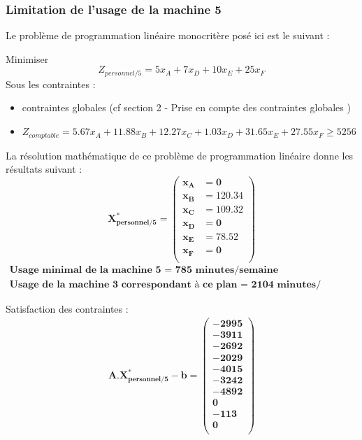 \documentclass[12pt]{article}
\begin{document}
\subsubsection{Limitation de l'usage de la machine 5}
Le problème de programmation linéaire monocritère posé ici est le suivant :
\begin{tcolorbox}
Minimiser
\begin{equation*}
 Z_{personnel/5}= 5x_{A} + 7x_{D} + 10x_{E} + 25x_{F}
\end{equation*}
Sous les contraintes :
\begin{itemize}
\item contraintes globales (cf section 2 - Prise en compte des contraintes globales )
\item $ Z_{comptable}= 5.67x_{A} +11.88x_{B} +12.27x_{C} +1.03x_{D} +31.65x_{E} +27.55x_{F} \geq 5256$
\end{itemize}
\end{tcolorbox}
La résolution mathématique de ce problème de programmation linéaire donne les résultats suivant :\\
\begin{equation*}
\boldsymbol{X^{*}_{personnel/5} = 
   \left (
   \begin{aligned}
      x_{A} &= 0 \\
      x_{B} &= 120.34 \\
      x_{C} &= 109.32 \\
      x_{D} &= 0 \\
      x_{E} &= 78.52 \\ 
      x_{F} &= 0 \\
   \end{aligned}
   \right )
 } 
\end{equation*}
\begin{align*}
\textbf{Usage minimal de la machine 5 = 785 minutes/semaine} \\
\textbf{Usage de la machine 3 correspondant à ce plan = 2104 minutes/semaine}
\end{align*}


Satisfaction des contraintes : 
\begin{align*}
\boldsymbol{A.X^{*}_{personnel/5} - b = 
   \left (
   \begin{aligned}
      -2995 \\
      -3911 \\
      -2692 \\
      -2029 \\
      -4015 \\
      -3242 \\
      -4892 \\
      0 \\
      -113 \\
      0\\
   \end{aligned}
   \right )
 } 
\end{align*}
\end{document}
